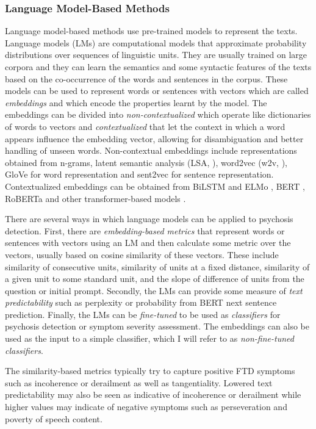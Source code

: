 \subsubsection{Language Model-Based Methods}
Language model-based methods use pre-trained models to represent the texts. Language models (LMs) are computational models that approximate probability distributions over sequences of linguistic units. They are usually trained on large corpora and they can learn the semantics and some syntactic features of the texts based on the co-occurrence of the words and sentences in the corpus. These models can be used to represent words or sentences with vectors which are called \textit{embeddings} and which encode the properties learnt by the model. The embeddings can be divided into \textit{non-contextualized} which operate like dictionaries of words to vectors and \textit{contextualized} that let the context in which a word appears influence the embedding vector, allowing for disambiguation and better handling of unseen words. Non-contextual embeddings include representations obtained from n-grams, latent semantic analysis (LSA, \citet{landauer1998introduction}), word2vec (w2v, \citet{mikolov2013distributed}), GloVe \citep{pennington2014glove} for word representation and sent2vec \citep{moghadasi2020sent2vec} for sentence representation. Contextualized embeddings can be obtained from BiLSTM and ELMo \citep{peters2017semi}, BERT \citep{devlin2018bert}, RoBERTa \citep{liu2019roberta} and other transformer-based models \citep{vaswani2017attention, openai2023gpt4}.

There are several ways in which language models can be applied to psychosis detection. First, there are \textit{embedding-based metrics} that represent words or sentences with vectors using an LM and then calculate some metric over the vectors, usually based on cosine similarity of these vectors. These include similarity of consecutive units, similarity of units at a fixed distance, similarity of a given unit to some standard unit, and the slope of difference of units from the question or initial prompt. Secondly, the LMs can provide some measure of \textit{text predictability} such as perplexity or probability from BERT next sentence prediction. Finally, the LMs can be \textit{fine-tuned} to be used as \textit{classifiers} for psychosis detection or symptom severity assessment. The embeddings can also be used as the input to a simple classifier, which I will refer to as \textit{non-fine-tuned classifiers}.

The similarity-based metrics typically try to capture positive FTD symptoms such as incoherence or derailment as well as tangentiality. Lowered text predictability may also be seen as indicative of incoherence or derailment while higher values may indicate of negative symptoms such as perseveration and poverty of speech content.

